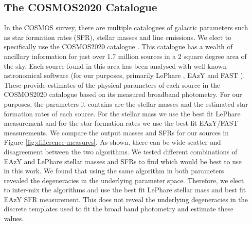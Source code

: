\subsection{The COSMOS2020 Catalogue}
In the COSMOS survey, there are multiple catalogues of galactic parameters such as star formation rates (SFR), stellar masses and line emissions. We elect to specifically use the COSMOS2020 catalogue \citep{2022ApJS..258...11W}. This catalogue has a wealth of ancillary information for just over 1.7 million sources in a 2 square degree area of the sky. Each source found in this area has been analysed with well known astronomical software (for our purposes, primarily  LePhare \citep{1999MNRAS.310..540A, 2006A&A...457..841I}, EAzY \citep{2008ApJ...686.1503B} and FAST \citep{2017MNRAS.465.3390A}). These provide estimates of the physical parameters of each source in the COSMOS2020 catalogue based on its measured broadband photometry. For our purposes, the parameters it contains are the stellar masses and the estimated star formation rates of each source. For the stellar mass we use the best fit LePhare measurement and for the star formation rates we use the best fit EAzY/FAST measurements. We compare the output masses and SFRs for our sources in Figure \ref{fig:difference-measures}. As shown, there can be wide scatter and disagreement between the two algorithms. We tested different combinations of EAzY and LePhare stellar masses and SFRs to find which would be best to use in this work. We found that using the same algorithm in both parameters revealed the degeneracies in the underlying parameter space. Therefore, we elect to inter-mix the algorithms and use the best fit LePhare stellar mass and best fit EAzY SFR measurement. This does not reveal the underlying degeneracies in the discrete templates used to fit the broad band photometry and estimate these values.

